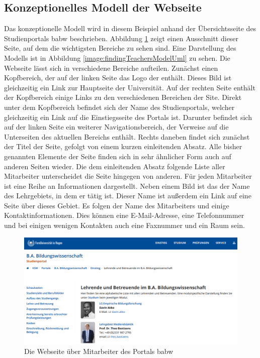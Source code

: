 \subsection{Konzeptionelles Modell der Webseite}
    \label{section:findingsTeachersConceptualModel}
    Das konzeptionelle Modell wird in diesem Beispiel anhand
    der Übersichtsseite des Studienportals \gls{babw} beschrieben.
    Abbildung \ref{image:findingTeachersModelOverview} zeigt einen
    Ausschnitt dieser Seite, auf dem die wichtigsten Bereiche zu sehen sind.
    Eine Darstellung des Modells ist in Abbildung
    \ref{image:findingTeachersModelUml} zu sehen.
    Die Webseite lässt sich in verschiedene Bereiche aufteilen.
    Zunächst einen Kopfbereich, der auf der linken Seite das Logo
    der {\fernUni} enthält.
    Dieses Bild ist gleichzeitig ein Link zur Hauptseite der Universität. 
    Auf der rechten Seite enthält der Kopfbereich einige Links zu den verschiedenen
    Bereichen der Site.
    Direkt unter dem Kopfbereich befindet sich der Name des Studienportals,
    welcher gleichzeitig ein Link auf die Einstiegsseite des Portals ist.
    Darunter befindet sich auf der linken Seite ein weiterer Navigationsbereich,
    der Verweise auf die Unterseiten des aktuellen Bereichs enthält.
    Rechts daneben findet sich zunächst der Titel der Seite,
    gefolgt von einem kurzen einleitenden Absatz.
    Alle bisher genannten Elemente der Seite finden sich in sehr ähnlicher Form
    auch auf anderen Seiten wieder.
    Die dem einleitenden Absatz folgende Liste aller Mitarbeiter unterscheidet die Seite hingegen von anderen.
    Für jeden Mitarbeiter ist eine Reihe an Informationen dargestellt.
    Neben einem Bild ist das der Name des Lehrgebiets, in dem er tätig ist.
    Dieser Name ist außerdem ein Link auf eine Seite über dieses Gebiet.
    Es folgen der Name des Mitarbeiters
    und einige Kontaktinformationen.
    Dies können eine E-Mail-Adresse, eine Telefonnummer
    und bei einigen wenigen Kontakten auch eine Faxnummer und ein Raum sein.

    \begin{figure}[t]
        \centering
        \includegraphics[width=\textwidth]{../resources/findings/case-study-1/model/overview.png}
        \caption{Die Webseite über Mitarbeiter des Portals \acrshort{babw}}
        \label{image:findingTeachersModelOverview}
    \end{figure}

